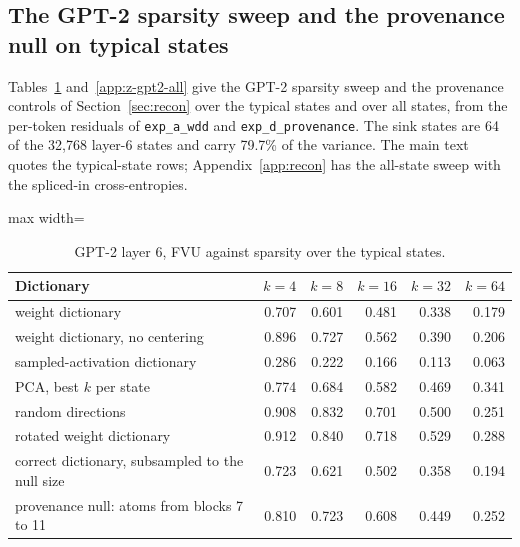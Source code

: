 \subsection{The GPT-2 sparsity sweep and the provenance null on typical states}\label{app:z-gpt2}
Tables~\ref{app:z-gpt2-typical} and~\ref{app:z-gpt2-all} give the GPT-2 sparsity sweep and the provenance controls of Section~\ref{sec:recon} over the typical states and over all states, from the per-token residuals of \texttt{exp\_a\_wdd} and \texttt{exp\_d\_provenance}. The sink states are 64 of the 32{,}768 layer-6 states and carry 79.7\% of the variance. The main text quotes the typical-state rows; Appendix~\ref{app:recon} has the all-state sweep with the spliced-in cross-entropies.
\begin{table}[H]\centering\scriptsize
\caption{GPT-2 layer 6, FVU against sparsity over the typical states.}\label{app:z-gpt2-typical}
\begin{adjustbox}{max width=\linewidth}
\begin{tabular}{lrrrrr}\toprule
Dictionary & $k=4$ & $k=8$ & $k=16$ & $k=32$ & $k=64$ \\ \midrule
weight dictionary & 0.707 & 0.601 & 0.481 & 0.338 & 0.179 \\
weight dictionary, no centering & 0.896 & 0.727 & 0.562 & 0.390 & 0.206 \\
sampled-activation dictionary & 0.286 & 0.222 & 0.166 & 0.113 & 0.063 \\
PCA, best $k$ per state & 0.774 & 0.684 & 0.582 & 0.469 & 0.341 \\
random directions & 0.908 & 0.832 & 0.701 & 0.500 & 0.251 \\
rotated weight dictionary & 0.912 & 0.840 & 0.718 & 0.529 & 0.288 \\
correct dictionary, subsampled to the null size & 0.723 & 0.621 & 0.502 & 0.358 & 0.194 \\
provenance null: atoms from blocks 7 to 11 & 0.810 & 0.723 & 0.608 & 0.449 & 0.252 \\
\bottomrule\end{tabular}\end{adjustbox}
\end{table}
